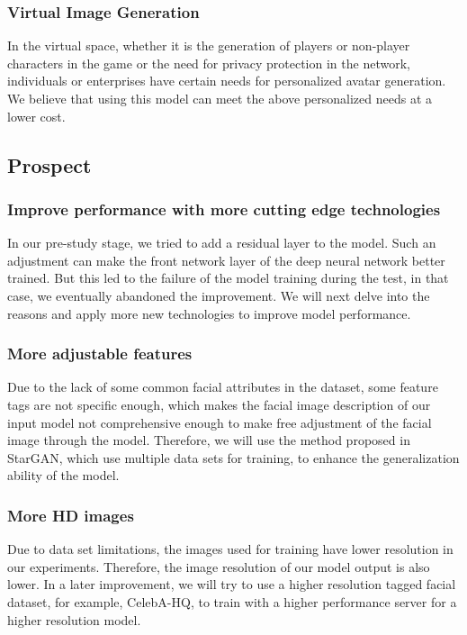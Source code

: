 \subsubsection*{Virtual Image Generation}
In the virtual space, whether it is the generation of players or non-player characters in the game or the need for privacy protection in the network, individuals or enterprises have certain needs for personalized avatar generation.
We believe that using this model can meet the above personalized needs at a lower cost.

\subsection{Prospect}
\subsubsection*{Improve performance with more cutting edge technologies}

In our pre-study stage, we tried to add a residual layer to the model. Such an adjustment can make the front network layer of the deep neural network better trained. But this led to the failure of the model training during the test, in that case, we eventually abandoned the improvement.
We will next delve into the reasons and apply more new technologies to improve model performance.


\subsubsection*{More adjustable features}

Due to the lack of some common facial attributes in the dataset, some feature tags are not specific enough, which makes the facial image description of our input model not comprehensive enough to make free adjustment of the facial image through the model.
Therefore, we will use the method proposed in StarGAN, which use multiple data sets for training, to enhance the generalization ability of the model.


\subsubsection*{More HD images}
Due to data set limitations, the images used for training have lower resolution in our experiments.
Therefore, the image resolution of our model output is also lower. In a later improvement, we will try to use a higher resolution tagged facial dataset, for example, CelebA-HQ, to train with a higher performance server for a higher resolution model.
